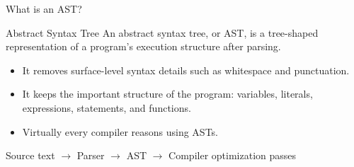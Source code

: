 \documentclass[aspectratio=169,11pt]{beamer}
\begin{document}
\begin{frame}{What is an AST?}
	\begin{block}{Abstract Syntax Tree}
		An abstract syntax tree, or AST, is a tree-shaped representation of a program's execution structure after parsing.
	\end{block}

	\vspace{0.25cm}
	\begin{itemize}
		\item It removes surface-level syntax details such as whitespace and punctuation.
		\item It keeps the important structure of the program: variables, literals,
		      expressions, statements, and functions.
		\item Virtually every compiler reasons using ASTs.
	\end{itemize}

	\vspace{0.3cm}
	\centering
	\Large
	Source text $\rightarrow$ Parser $\rightarrow$ AST $\rightarrow$ Compiler optimization passes
\end{frame}
\end{document}
